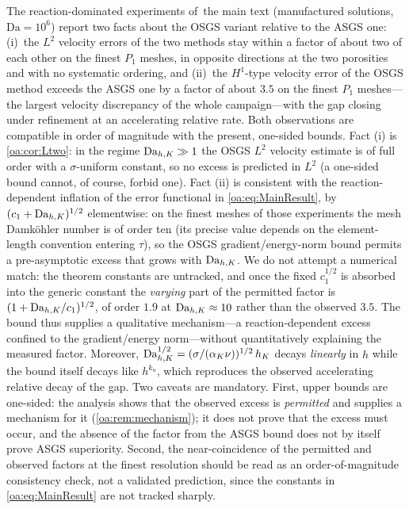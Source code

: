 \begin{remark}
\label{oa:rem:numerics}
The reaction-dominated experiments of~the main text (manufactured
solutions, $\mathrm{Da} = 10^6$) report two facts about the OSGS variant relative to the ASGS
one: (i)~the $L^2$ velocity errors of the two methods stay within a factor of about two of
each other on the finest $P_1$ meshes, in opposite directions at the two porosities and with no
systematic ordering, and (ii)~the $H^1$-type velocity error of the OSGS method exceeds the
ASGS one by a factor of about $3.5$ on the finest $P_1$ meshes---the largest velocity
discrepancy of the whole campaign---with the gap closing under refinement at an
accelerating relative rate. Both observations are compatible in order of magnitude with
the present, one-sided bounds. Fact (i) is \cref{oa:cor:Ltwo}: in the regime $\mathrm{Da}_{h,K} \gg 1$ the
OSGS $L^2$ velocity estimate is of full order with a $\sigma$-uniform constant, so no excess
is predicted in $L^2$ (a one-sided bound cannot, of course, forbid one). Fact (ii) is consistent with the
reaction{\hyp}dependent inflation of the error functional in \cref{oa:eq:MainResult}, by
$(c_1+\mathrm{Da}_{h,K})^{1/2}$ elementwise: on the finest meshes of those experiments the mesh
Damk\"ohler number is of order ten (its precise value depends on the element-length
convention entering $\tau$), so the OSGS gradient/energy{\hyp}norm bound permits a
pre{\hyp}asymptotic excess that grows with $\mathrm{Da}_{h,K}$. We do not attempt a numerical match:
the theorem constants are untracked, and once the fixed $c_1^{1/2}$ is absorbed into the
generic constant the \emph{varying} part of the permitted factor is $(1+\mathrm{Da}_{h,K}/c_1)^{1/2}$,
of order $1.9$ at $\mathrm{Da}_{h,K}\approx10$ rather than the observed $3.5$. The bound thus supplies a
qualitative mechanism---a reaction{\hyp}dependent excess confined to the gradient/energy
norm---without quantitatively explaining the measured factor. Moreover,
$\mathrm{Da}_{h,K}^{1/2} = (\sigma/(\alpha_K\nu))^{1/2}\, h_K$ decays \emph{linearly} in $h$ while
the bound itself decays like $h^{k_u}$, which reproduces the observed accelerating
relative decay of the gap. Two caveats are mandatory. First, upper bounds are
one-sided: the analysis shows that the observed excess is \emph{permitted} and
supplies a mechanism for it (\cref{oa:rem:mechanism}); it does not prove that the excess
must occur, and the absence of the factor from the ASGS bound does not by itself prove
ASGS superiority. Second, the near-coincidence of the permitted and observed factors
at the finest resolution should be read as an order-of-magnitude consistency check,
not a validated prediction, since the constants in \cref{oa:eq:MainResult} are not
tracked sharply.
\end{remark}

